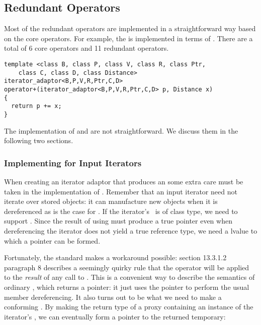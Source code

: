 \documentclass{netobjectdays}
\newcommand{\valuetype}{\code{value\_\-type}}
\begin{document}
\subsection{Redundant Operators}

Most of the redundant operators are implemented in a straightforward
way based on the core operators. For example, the  is
implemented in terms of . There are a total of 6 core
operators and 11 redundant operators.

{\footnotesize
\begin{verbatim}
template <class B, class P, class V, class R, class Ptr,
    class C, class D, class Distance>
iterator_adaptor<B,P,V,R,Ptr,C,D>
operator+(iterator_adaptor<B,P,V,R,Ptr,C,D> p, Distance x)
{
  return p += x;
}
\end{verbatim}
}

The implementation of  and are not
straightforward. We discuss them in the following two sections.

\subsubsection{Implementing  for Input Iterators}
\label{sec:operator-arrow}

When creating an iterator adaptor that produces an
 some extra care must be taken in the
implementation of . Remember that an input iterator
need not iterate over stored objects: it can manufacture new objects
when it is dereferenced as is the case for
. If the iterator's \valuetype\ is of
class type, we need to support . Since the result of
using  must produce a true pointer even when
dereferencing the iterator does not yield a true reference type, we
need a  lvalue to which a pointer can be formed.

Fortunately, the standard makes a workaround possible: section
13.3.1.2 paragraph 8 describes a seemingly quirky rule that the
\code{->} operator will be applied to the \emph{result} of any call to
. This is a convenient way to describe the semantics
of ordinary , which returns a pointer: it just uses
the pointer to perform the usual member dereferencing. It also turns
out to be what we need to make a conforming
. By making the return type of
 a proxy containing an instance of the iterator's
\valuetype{}, we can eventually form a  pointer to the
returned temporary:
\end{document}

